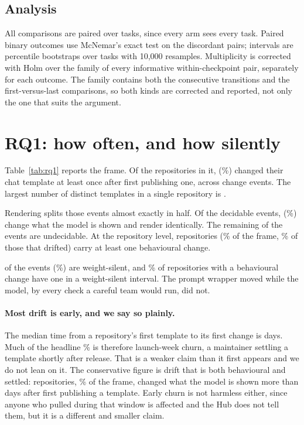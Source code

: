 \subsection{Analysis}

All comparisons are paired over tasks, since every arm sees every task. Paired binary outcomes use
McNemar's exact test on the discordant pairs; intervals are percentile bootstraps over tasks with
10{,}000 resamples. Multiplicity is corrected with Holm over the family of every informative
within-checkpoint pair, separately for each outcome. The family contains both the consecutive
transitions and the first-versus-last comparisons, so both kinds are corrected and reported, not
only the one that suits the argument.

\section{RQ1: how often, and how silently}
\label{sec:rq1}



Table~\ref{tab:rq1} reports the frame. Of the \NFrame{} repositories in it, \NDrifted{}
(\PctDrifted\%) changed their chat template
at least once after first publishing one, across \NEvents{} change events. The largest number of
distinct templates in a single repository is \MaxDistinctTemplates{}.

Rendering splits those events almost exactly in half. Of the \NEventsDecidable{} decidable events,
\NEventsBeh{} (\PctEventsBeh\%) change what the model is shown and \NEventsCosmetic{} render
identically. The remaining \NEventsUndecidable{} of the \NEvents{} events are undecidable. At the repository level, \NBehavioural{}
repositories (\PctBehFrame\% of the frame, \PctBehDrifted\% of those that drifted) carry at least one
behavioural change.

\NEventsWeightSilent{} of the \NEvents{} events (\PctEventsWeightSilent\%) are weight-silent, and
\PctBehWeightSilent\% of repositories with a behavioural change have one in a weight-silent interval.
The prompt wrapper moved while the model, by every check a careful team would run, did not.

\paragraph{Most drift is early, and we say so plainly.} The median time from a repository's first
template to its first change is \MedianDaysFirstChange{} days. Much of the headline
\PctDrifted\% is therefore launch-week churn, a maintainer settling a template shortly after
release. That is a weaker claim than it first appears and we do not lean on it. The conservative
figure is drift that is both behavioural and settled: \NBehSettled{} repositories, \PctBehSettledFrame\%
of the frame, changed what the model is shown more than \SettledDays{} days after first publishing a
template. Early churn is not harmless either, since anyone who pulled during that window is affected
and the Hub does not tell them, but it is a different and smaller claim.

